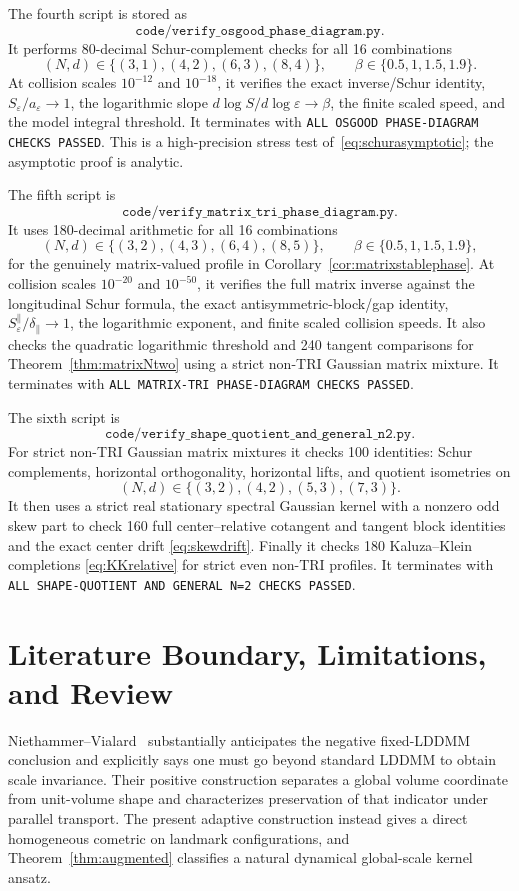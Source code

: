 \documentclass[11pt]{article}
\begin{document}
The fourth script is stored as
\[
 \texttt{code/verify\_osgood\_phase\_diagram.py}.
\]
It performs 80-decimal Schur-complement checks for all 16 combinations
\[
 (N,d)\in\{(3,1),(4,2),(6,3),(8,4)\},
 \qquad
 \beta\in\{0.5,1,1.5,1.9\}.
\]
At collision scales \(10^{-12}\) and \(10^{-18}\), it verifies the exact
inverse/Schur identity, \(S_\varepsilon/a_\varepsilon\to1\), the logarithmic
slope \(d\log S/d\log\varepsilon\to\beta\), the finite scaled speed, and the
model integral threshold.  It terminates with
\texttt{ALL OSGOOD PHASE-DIAGRAM CHECKS PASSED}.  This is a high-precision
stress test of~\eqref{eq:schurasymptotic}; the asymptotic proof is analytic.

The fifth script is
\[
 \texttt{code/verify\_matrix\_tri\_phase\_diagram.py}.
\]
It uses 180-decimal arithmetic for all 16 combinations
\[
 (N,d)\in\{(3,2),(4,3),(6,4),(8,5)\},
 \qquad
 \beta\in\{0.5,1,1.5,1.9\},
\]
for the genuinely matrix-valued profile in
Corollary~\ref{cor:matrixstablephase}.  At collision scales \(10^{-20}\)
and \(10^{-50}\), it verifies the full matrix inverse against the
longitudinal Schur formula, the exact antisymmetric-block/gap identity,
\(S_\varepsilon^\parallel/\delta_\parallel\to1\), the logarithmic exponent,
and finite scaled collision speeds.  It also checks the quadratic
logarithmic threshold and 240 tangent comparisons for
Theorem~\ref{thm:matrixNtwo} using a strict non-TRI Gaussian matrix mixture.
It terminates with
\texttt{ALL MATRIX-TRI PHASE-DIAGRAM CHECKS PASSED}.

The sixth script is
\[
 \texttt{code/verify\_shape\_quotient\_and\_general\_n2.py}.
\]
For strict non-TRI Gaussian matrix mixtures it checks 100 identities:
Schur complements, horizontal orthogonality, horizontal lifts, and quotient
isometries on
\[
 (N,d)\in\{(3,2),(4,2),(5,3),(7,3)\}.
\]
It then uses a strict real stationary spectral Gaussian kernel with a
nonzero odd skew part to check 160 full center--relative cotangent and
tangent block identities and the exact center drift
\eqref{eq:skewdrift}.  Finally it checks 180 Kaluza--Klein completions
\eqref{eq:KKrelative} for strict even non-TRI profiles.  It terminates with
\texttt{ALL SHAPE-QUOTIENT AND GENERAL N=2 CHECKS PASSED}.

\section*{Literature Boundary, Limitations, and Review}

Niethammer--Vialard~\cite{NV} substantially anticipates the negative
fixed-LDDMM conclusion and explicitly says one must go beyond standard LDDMM
to obtain scale invariance.  Their positive construction separates a global
volume coordinate from unit-volume shape and characterizes preservation of
that indicator under parallel transport.  The present adaptive construction
instead gives a direct homogeneous cometric on landmark configurations, and
Theorem~\ref{thm:augmented} classifies a natural dynamical global-scale
kernel ansatz.
\end{document}
